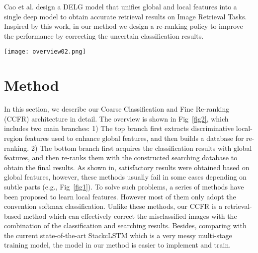 \documentclass[10pt,twocolumn,letterpaper]{article}
\begin{document}
Cao et al.\cite{DBLP:journals/corr/abs-2001-05027} design a DELG model that unifies global and local features into a single deep model to obtain accurate retrieval results on Image Retrieval Tasks. 
Inspired by this work, in our method we design a re-ranking policy to improve the performance by correcting the uncertain  classification results.


\begin{figure*}
\begin{center}
\texttt{[image: overview02.png]}
\end{center}
   \caption{The overview of our CCFR architecture. It mainly includes two branches: 1) On the top branch, we utilize the Triplet loss and the Scale-separated NMS to discover more discriminative local regions, and integrate these region features with the whole image features to obtain the final embedding features, which are used to build a searching database. 2) On the bottom branch, we first obtain the Coarse Classifications (the  Softmax probabilities), and then re-rank them by the statistic of the retrievals from the searching database. The Feature Extractor is pretrained by a proposed Multi-level loss and is updated by the combination of a Triplet loss and a Softmax loss during training.}
\label{fig2}
\end{figure*}
\section{Method}
In this section, we describe our Coarse Classification and Fine Re-ranking (CCFR) architecture in detail. The overview is shown in Fig~\ref{fig2}, which includes two main branches: 1) The top branch first extracts discriminative local-region features used to enhance global features, and then builds a database for re-ranking. 2) The bottom branch first acquires the  classification results with global features, and then re-ranks them with the constructed searching database to obtain the final results. As shown in\cite{li2017dynamic,cui2018large,SimonRDD20}, satisfactory results were obtained based on global features, however, these methods usually fail in some cases depending on subtle parts (e.g., Fig~\ref{fig1}). To solve such problems, a series of methods\cite{YangLWHGW18,GeLY19,korsch2019classification,du2020fine,abs-2004-02684,ZhuangW020} have been proposed to learn local features. However most of them only adopt the convention softmax classification.
Unlike these methods, our CCFR is a retrieval-based method which can effectively correct the misclassified images with the combination of the  classification and searching results.
Besides, comparing with the current state-of-the-art StackcLSTM\cite{GeLY19} which is a very messy multi-stage training model, the model in our method is easier to implement and train.
\end{document}
